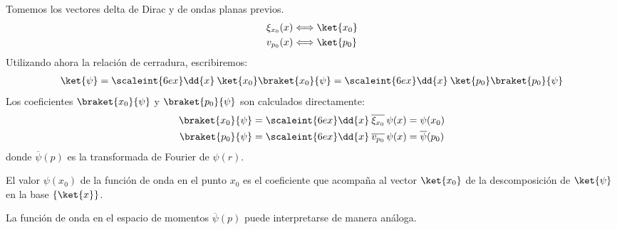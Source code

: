 Tomemos los vectores delta de Dirac y de ondas planas previos.
\begin{align*}
\xi_{x_{0}} (x) & \Longleftrightarrow \ket{x_{0}} \\
v_{p_{0}} (x) & \Longleftrightarrow \ket{p_{0}}
\end{align*}
Utilizando ahora la relación de cerradura, escribiremos:
\begin{align*} 
\ket{\psi} = \scaleint{6ex} \dd{x} \: \ket{x_{0}} \braket{x_{0}}{\psi} = \scaleint{6ex} \dd{x} \: \ket{p_{0}} \braket{p_{0}}{\psi}
\end{align*}
Los coeficientes $\braket{x_0}{\psi}$ y $\braket{p_{0}}{\psi}$ son calculados directamente:
\begin{align*}
\braket{x_0}{\psi} &= \scaleint{6ex} \dd{x} \: \overline{\xi_{x_{0}}} \, \psi (x) =  \psi (x_{0}) \\
\braket{p_0}{\psi} &= \scaleint{6ex} \dd{x} \: \overline{v_{p_{0}}} \, \psi (x) =  \overline{\psi} (p_{0})
\end{align*}
donde $\overline{\psi} (p)$ es la transformada de Fourier de $\psi (r)$.
\par
El valor $\psi (x_{0})$ de la función de onda en el punto $x_{0}$ es el coeficiente que acompaña al vector $\ket{x_{0}}$ de la descomposición de $\ket{\psi}$ en la base $\{ \ket{x} \}$.
\par
La función de onda en el espacio de momentos $\overline{\psi} (p)$ puede interpretarse de manera análoga.
